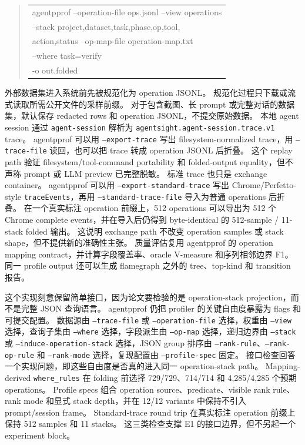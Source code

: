 \documentclass[10pt,twocolumn]{ctexart}
\newcommand{\toolname}{agentpprof}
\begin{document}
\begin{quote}\scriptsize\ttfamily
\begin{tabular}{@{}l@{}}
agentpprof --operation-file ops.jsonl --view operations \\
\quad --stack project,dataset,task,phase,op,tool, \\
\quad action,status --op-map-file operation-map.txt \\
\quad --where task=verify \\
\quad -o out.folded
\end{tabular}
\end{quote}

外部数据集进入系统前先被规范化为 operation JSONL。
规范化过程只下载或流式读取所需公开文件的采样前缀。
对于包含截图、长 prompt 或完整对话的数据集，默认保存 redacted rows 和 operation JSONL，不提交原始数据。
本地 agent session 通过 \texttt{agent-session} 解析为 \texttt{agentsight.agent-session.trace.v1} trace。
\toolname{} 可以用 \texttt{--export-trace} 写出 filesystem-normalized trace，用 \texttt{--trace-file} 读回，也可以把 trace 转成 operation JSONL 后折叠。
这个 replay path 验证 filesystem/tool-command portability 和 folded-output equality，但不声称 prompt 或 LLM preview 已完整脱敏。
标准 trace 也只是 exchange container。
\toolname{} 可以用 \texttt{--export-standard-trace} 写出 Chrome/Perfetto-style \texttt{traceEvents}，再用 \texttt{--standard-trace-file} 导入为普通 operations 后折叠。
在一个真实标注 operation 前缀上，512 operations 可以导出为 512 个 Chrome complete events，并在导入后仍得到 byte-identical 的 512-sample / 11-stack folded 输出。
这说明 exchange path 不改变 operation samples 或 stack shape，但不提供新的准确性主张。
质量评估复用 \toolname{} 的 operation mapping contract，并计算字段覆盖率、oracle V-measure 和序列相邻边界 F1。
同一 profile output 还可以生成 flamegraph 之外的 tree、top-kind 和 transition 报告。

这个实现刻意保留简单接口，因为论文要检验的是 operation-stack projection，而不是完整 JSON 查询语言。
\toolname{} 仍把 profiler 的关键自由度暴露为 flags 和可提交配置。
数据源由 \texttt{--trace-file} 或 \texttt{--operation-file} 选择，权重由 \texttt{--view} 选择，查询子集由 \texttt{--where} 选择，字段派生由 \texttt{--op-map} 选择，递归边界由 \texttt{--stack} 或 \texttt{--induce-operation-stack} 选择，JSON group 排序由 \texttt{--rank-rule}、\texttt{--rank-op-rule} 和 \texttt{--rank-mode} 选择，复现配置由 \texttt{--profile-spec} 固定。
接口检查回答一个实现问题，即这些自由度是否真的进入同一 operation-stack path。
Mapping-derived \texttt{where\_rules} 在 folding 前选择 729/729、714/714 和 4,285/4,285 个预期 operations。
Profile specs 组合 operation source、predicate、visible rank rule、rank mode 和显式 stack depth，并在 12/12 variants 中保持不引入 prompt/session frame。
Standard-trace round trip 在真实标注 operation 前缀上保持 512 samples 和 11 stacks。
这三类检查支撑 E1 的接口边界，但不另起一个 experiment block。
\end{document}
